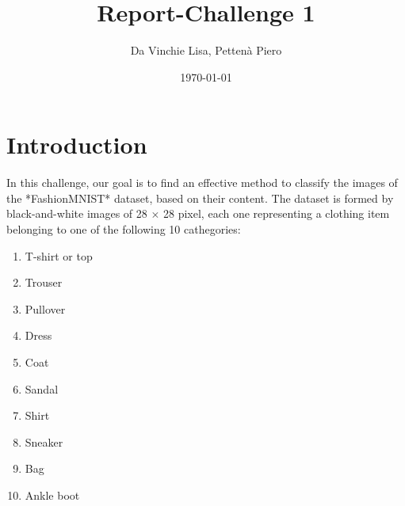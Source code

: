 \documentclass[12pt]{article}
\title{Report-Challenge 1}
\author{Da Vinchie Lisa, Pettenà Piero}
\date{\today} %
\begin{document}
\maketitle


\tableofcontents

\section{Introduction}
In this challenge, our goal is to find an effective method to classify the images of the *FashionMNIST* dataset, based on their content. The dataset is formed by black-and-white images of 28 $\times$ 28 pixel, each one representing a clothing item belonging to one of the following 10 cathegories:

\begin{enumerate}
	\item T-shirt or top
	\item Trouser
	\item Pullover
	\item Dress
	\item Coat
	\item Sandal
	\item Shirt
	\item Sneaker
	\item Bag
	\item Ankle boot
\end{enumerate}
\end{document}
